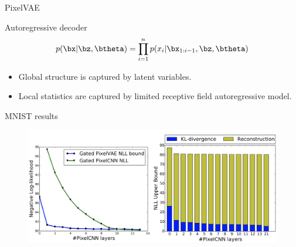 \begin{frame}{PixelVAE}
	\begin{block}{Autoregressive decoder}
		\vspace{-0.3cm}
		\[
		p(\bx | \bz , \btheta) = \prod_{i=1}^n p(x_i | \bx_{1:i - 1}, \bz , \btheta)
		\]
		\vspace{-0.3cm}
	\end{block}
	\begin{itemize}
		\item Global structure is captured by latent variables.
		\item Local statistics are captured by limited receptive field autoregressive model.
	\end{itemize}
	\vspace{-0.1cm}
	\begin{block}{MNIST results}
		\vspace{-0.3cm}
		\begin{figure}
		    \centering
		    \includegraphics[width=0.75\linewidth]{figs/PixelVAE_2.png}
		\end{figure}
	\end{block}
		
\end{frame}
